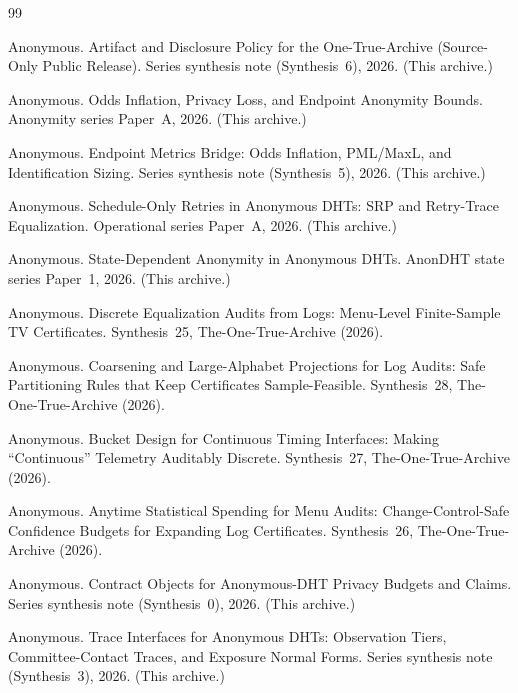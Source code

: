 \documentclass[11pt]{article}
\begin{document}
\begin{thebibliography}{99}\small

Anonymous.
\newblock Artifact and Disclosure Policy for the One-True-Archive (Source-Only Public Release).
\newblock Series synthesis note (Synthesis~6), 2026. (This archive.)

Anonymous.
\newblock Odds Inflation, Privacy Loss, and Endpoint Anonymity Bounds.
\newblock Anonymity series Paper~A, 2026. (This archive.)

Anonymous.
\newblock Endpoint Metrics Bridge: Odds Inflation, PML/MaxL, and Identification Sizing.
\newblock Series synthesis note (Synthesis~5), 2026. (This archive.)


Anonymous.
\newblock Schedule-Only Retries in Anonymous DHTs: SRP and Retry-Trace Equalization.
\newblock Operational series Paper~A, 2026. (This archive.)

Anonymous.
\newblock State-Dependent Anonymity in Anonymous DHTs.
\newblock AnonDHT state series Paper~1, 2026. (This archive.)

Anonymous.
\newblock Discrete Equalization Audits from Logs: Menu-Level Finite-Sample TV Certificates.
\newblock Synthesis~25, The-One-True-Archive (2026).

Anonymous.
\newblock Coarsening and Large-Alphabet Projections for Log Audits: Safe Partitioning Rules that Keep Certificates Sample-Feasible.
\newblock Synthesis~28, The-One-True-Archive (2026).

Anonymous.
\newblock Bucket Design for Continuous Timing Interfaces: Making ``Continuous'' Telemetry Auditably Discrete.
\newblock Synthesis~27, The-One-True-Archive (2026).

Anonymous.
\newblock Anytime Statistical Spending for Menu Audits: Change-Control-Safe Confidence Budgets for Expanding Log Certificates.
\newblock Synthesis~26, The-One-True-Archive (2026).

Anonymous.
\newblock Contract Objects for Anonymous-DHT Privacy Budgets and Claims.
\newblock Series synthesis note (Synthesis~0), 2026. (This archive.)

Anonymous.
\newblock Trace Interfaces for Anonymous {DHT}s: Observation Tiers, Committee-Contact Traces, and Exposure Normal Forms.
\newblock Series synthesis note (Synthesis~3), 2026. (This archive.)


\end{thebibliography}
\end{document}
